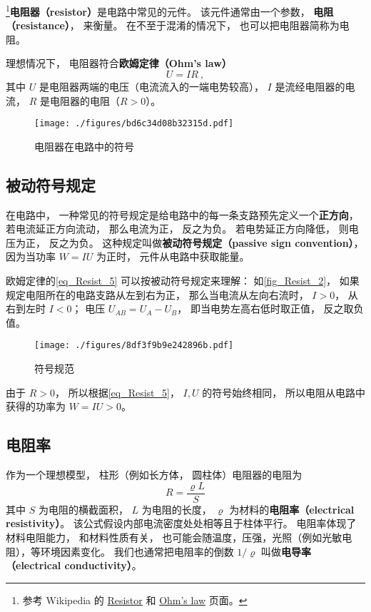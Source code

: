 

\footnote{参考 Wikipedia 的 \href{https://en.wikipedia.org/wiki/Resistor}{Resistor} 和 \href{https://en.wikipedia.org/wiki/Ohm's_law}{Ohm's law} 页面。}\textbf{电阻器（resistor）}是电路中常见的元件。 该元件通常由一个参数， \textbf{电阻（resistance）}， 来衡量。 在不至于混淆的情况下， 也可以把电阻器简称为电阻。

理想情况下， 电阻器符合\textbf{欧姆定律（Ohm's law）}
\begin{equation}\label{eq_Resist_5}
U = IR~,
\end{equation}
其中 $U$ 是电阻器两端的电压（电流流入的一端电势较高）， $I$ 是流经电阻器的电流， $R$ 是电阻器的电阻（$R > 0$）。

\begin{figure}[ht]
\centering
\texttt{[image: ./figures/bd6c34d08b32315d.pdf]}
\caption{电阻器在电路中的符号} \label{fig_Resist_3}
\end{figure}

\subsection{被动符号规定}\label{sub_Resist_1}
在电路中， 一种常见的符号规定是给电路中的每一条支路预先定义一个\textbf{正方向}， 若电流延正方向流动， 那么电流为正， 反之为负。 若电势延正方向降低， 则电压为正， 反之为负。 这种规定叫做\textbf{被动符号规定（passive sign convention）}， 因为当功率 $W = IU$ 为正时， 元件从电路中获取能量。

欧姆定律的\autoref{eq_Resist_5} 可以按被动符号规定来理解： 如\autoref{fig_Resist_2}， 如果规定电阻所在的电路支路从左到右为正， 那么当电流从左向右流时， $I > 0$， 从右到左时 $I < 0$； 电压 $U_{AB} = U_A - U_B$， 即当电势左高右低时取正值， 反之取负值。

\begin{figure}[ht]
\centering
\texttt{[image: ./figures/8df3f9b9e242896b.pdf]}
\caption{符号规范} \label{fig_Resist_2}
\end{figure}

由于 $R > 0$， 所以根据\autoref{eq_Resist_5}， $I, U$ 的符号始终相同， 所以电阻从电路中获得的功率为 $W = IU > 0$。

\subsection{电阻率}
作为一个理想模型， 柱形（例如长方体， 圆柱体）电阻器的电阻为
\begin{equation}
R = \frac{\varrho L}{S} 
\end{equation}
其中 $S$ 为电阻的横截面积， $L$ 为电阻的长度， $\varrho$ 为材料的\textbf{电阻率（electrical resistivity）}。 该公式假设内部电流密度处处相等且于柱体平行。 电阻率体现了材料电阻能力， 和材料性质有关， 也可能会随温度，压强，光照（例如光敏电阻），等环境因素变化。 我们也通常把电阻率的倒数 $1/\varrho$ 叫做\textbf{电导率（electrical conductivity）}。

